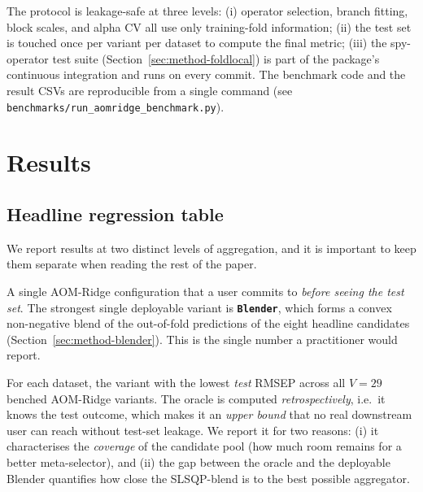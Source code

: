 \documentclass[11pt,a4paper]{article}
\begin{document}
The protocol is leakage-safe at three levels: (i) operator selection,
branch fitting, block scales, and alpha CV all use only training-fold
information; (ii) the test set is touched once per variant per dataset
to compute the final metric; (iii) the spy-operator test suite
(Section~\ref{sec:method-foldlocal}) is part of the package's
continuous integration and runs on every commit. The benchmark code
and the result CSVs are reproducible from a single command (see
\texttt{benchmarks/run\_aomridge\_benchmark.py}).

\section{Results}\label{sec:results}

\subsection{Headline regression table}\label{sec:headline}

We report results at two distinct levels of aggregation, and it is
important to keep them separate when reading the rest of the paper.

\begin{description}[leftmargin=2em,style=nextline]
  \item[\emph{Practical, deployable variant.}] A single AOM-Ridge
        configuration that a user commits to \emph{before seeing the
        test set}. The strongest single deployable variant is
        \textbf{\texttt{Blender}}, which forms a convex non-negative
        blend of the out-of-fold predictions of the eight headline
        candidates (Section~\ref{sec:method-blender}). This is the
        single number a practitioner would report.
  \item[\emph{Oracle envelope.}] For each dataset, the variant with
        the lowest \emph{test} RMSEP across all $V=29$ benched
        AOM-Ridge variants. The oracle is computed
        \emph{retrospectively}, i.e.\ it knows the test outcome,
        which makes it an \emph{upper bound} that no real downstream
        user can reach without test-set leakage. We report it for
        two reasons: (i) it characterises the \emph{coverage} of the
        candidate pool (how much room remains for a better
        meta-selector), and (ii) the gap between the oracle and the
        deployable Blender quantifies how close the SLSQP-blend is
        to the best possible aggregator.
\end{description}
\end{document}
